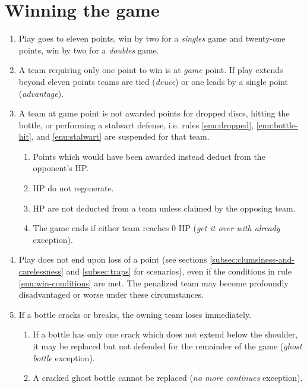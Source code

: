 \documentclass[11pt,letterpaper,twocolumn,english,DIV=calc]{scrartcl}
\begin{document}
\section{Winning the game}
\begin{enumerate}
	\item \label{enu:win-conditions}Play goes to eleven points, win by two for a \emph{singles} game and twenty-one points, win by two for a \emph{doubles} game. 
	\item A team requiring only one point to win is at \emph{game }point. 
	If play extends beyond eleven points teams are tied (\emph{deuce}) or one leads by a single point (\emph{advantage}).
	\item A team at game point is not awarded points for dropped discs, hitting the bottle, or performing a stalwart defense, i.e. rules \ref{enu:dropped}, \ref{enu:bottle-hit}, and \ref{enu:stalwart} are suspended for that team.

	\begin{enumerate}
		\item Points which would have been awarded instead deduct from the opponent's HP.
		\item HP do not regenerate.
		\item HP are not deducted from a team unless claimed by the opposing team.
		\item The game ends if either team reaches 0 HP (\emph{get it over with already} exception).
	\end{enumerate}

	\item Play does not end upon loss of a point (see sections \ref{subsec:clumsiness-and-carelessness} and \ref{subsec:traps} for scenarios), even if the conditions in rule \ref{enu:win-conditions} are met. 
	The penalized team may become profoundly disadvantaged or worse under these circumstances.
	\item If a bottle cracks or breaks, the owning team loses immediately.

	\begin{enumerate}
		\item If a bottle has only one crack which does not extend below the shoulder, it may be replaced but not defended for the remainder of the game (\emph{ghost bottle} exception).
		\item A cracked ghost bottle cannot be replaced (\emph{no more continues} exception).
	\end{enumerate}
\end{enumerate}
\end{document}
